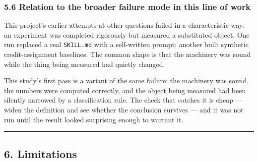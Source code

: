 \documentclass[
  11pt,
]{article}
\begin{document}
\hypertarget{relation-to-the-broader-failure-mode-in-this-line-of-work}{%
\subsubsection{5.6 Relation to the broader failure mode in this line of
work}\label{relation-to-the-broader-failure-mode-in-this-line-of-work}}

This project's earlier attempts at other questions failed in a
characteristic way: an experiment was completed rigorously but measured
a substituted object. One run replaced a real \texttt{SKILL.md} with a
self-written prompt; another built synthetic credit-assignment
baselines. The common shape is that the machinery was sound while the
thing being measured had quietly changed.

This study's first pass is a variant of the same failure: the machinery
was sound, the numbers were computed correctly, and the object being
measured had been silently narrowed by a classification rule. The check
that catches it is cheap --- widen the definition and see whether the
conclusion survives --- and it was not run until the result looked
surprising enough to warrant it.

\begin{center}\rule{0.5\linewidth}{0.5pt}\end{center}

\hypertarget{limitations}{%
\subsection{6. Limitations}\label{limitations}}
\end{document}
